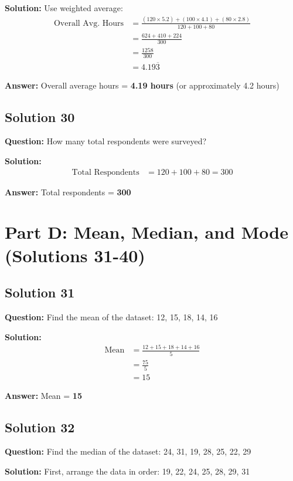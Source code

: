 \documentclass[12pt,a4paper]{article}
\begin{document}
\textbf{Solution:} Use weighted average:
\begin{align*}
\text{Overall Avg. Hours} &= \frac{(120 \times 5.2) + (100 \times 4.1) + (80 \times 2.8)}{120 + 100 + 80} \\
&= \frac{624 + 410 + 224}{300} \\
&= \frac{1258}{300} \\
&= 4.19\overline{3}
\end{align*}

\textbf{Answer:} Overall average hours = \textbf{4.19 hours} (or approximately 4.2 hours)

\subsection*{Solution 30}
\textbf{Question:} How many total respondents were surveyed?

\textbf{Solution:}
\begin{align*}
\text{Total Respondents} &= 120 + 100 + 80 = 300
\end{align*}

\textbf{Answer:} Total respondents = \textbf{300}

\newpage

\section{Part D: Mean, Median, and Mode (Solutions 31-40)}

\subsection*{Solution 31}
\textbf{Question:} Find the mean of the dataset: 12, 15, 18, 14, 16

\textbf{Solution:}
\begin{align*}
\text{Mean} &= \frac{12 + 15 + 18 + 14 + 16}{5} \\
&= \frac{75}{5} \\
&= 15
\end{align*}

\textbf{Answer:} Mean = \textbf{15}

\subsection*{Solution 32}
\textbf{Question:} Find the median of the dataset: 24, 31, 19, 28, 25, 22, 29

\textbf{Solution:} First, arrange the data in order: 19, 22, 24, 25, 28, 29, 31
\end{document}

